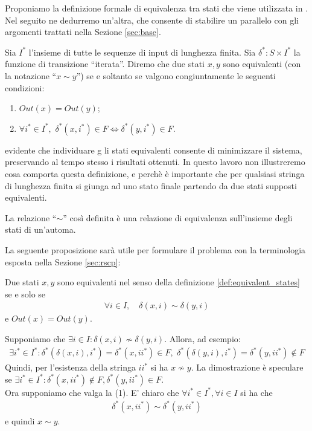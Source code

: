 Proponiamo la definizione formale di equivalenza tra stati che viene utilizzata in \cite{hopcroft}. Nel seguito ne dedurremo un'altra, che consente di stabilire un parallelo con gli argomenti trattati nella Sezione \ref{sec:base}.
\begin{definition}
    \label{def:equivalent_states}
    Sia $I^*$ l'insieme di tutte le sequenze di input di lunghezza finita. Sia $\delta^* : S \times I^*$ la funzione di transizione ``iterata''. Diremo che due stati $x,y$ sono equivalenti (con la notazione ``$x \sim y$'') se e soltanto se valgono congiuntamente le seguenti condizioni:
    \begin{enumerate}
        \item $Out(x) = Out(y)$;
        \item $\forall i^* \in I^*,\,\, \delta^*(x,i^*) \in F \iff \delta^*(y,i^*) \in F$.
    \end{enumerate}
\end{definition}
\accente evidente che individuare g
li stati equivalenti consente di minimizzare il sistema, preservando al tempo stesso i risultati ottenuti. In questo lavoro non illustreremo cosa comporta questa definizione, e perchè è importante che per qualsiasi stringa di lunghezza finita si giunga ad uno stato finale partendo da due stati supposti equivalenti.
\begin{observation}
    La relazione ``$\sim$'' così definita è una relazione di equivalenza sull'insieme degli stati di un'automa.
\end{observation}
La seguente proposizione sarà utile per formulare il problema con la terminologia esposta nella Sezione \ref{sec:rscp}:
\begin{proposition}
    \label{prop:equivalent_states}
    Due stati $x,y$ sono equivalenti nel senso della definizione \ref{def:equivalent_states} se e solo se
    \begin{gather}
        \forall i \in I, \quad \delta(x,i) \sim \delta(y,i)
    \end{gather}
    e $Out(x) = Out(y)$.
\end{proposition}
\begin{proof2}
    Supponiamo che $\exists i \in I : \delta(x,i) \not\sim \delta(y,i)$. Allora, ad esempio:
    \begin{gather*}
        \exists i^* \in I^* : \delta^*(\delta(x,i),i^*) = \delta^*(x,ii^*) \in F, \,\, \delta^*(\delta(y,i),i^*) = \delta^*(y,ii^*) \notin F
    \end{gather*}
    Quindi, per l'esistenza della stringa $ii^*$ si ha $x \not\sim y$. La dimostrazione è speculare se $\exists i^* \in I^* : \delta^*(x,ii^*) \notin F, \delta^*(y,ii^*) \in F$.\\
    Ora supponiamo che valga la (1). E' chiaro che $\forall i^* \in I^*, \forall i \in I$ si ha che
    \begin{gather*}
        \delta^*(x,ii^*) \sim \delta^*(y,ii^*)
    \end{gather*}
    e quindi $x \sim y$.
\end{proof2}
